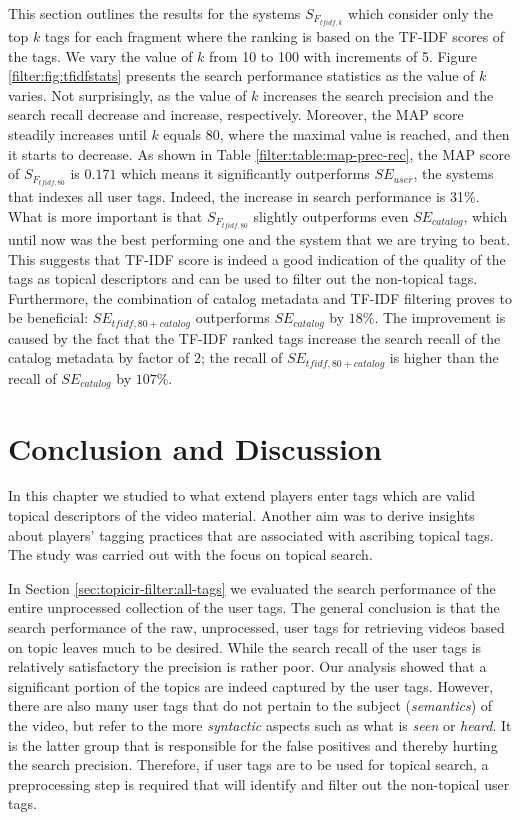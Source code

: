 This section outlines the results for the systems $S_{F_{tfidf,k}}$ which consider only the top $k$ tags for each fragment where the ranking is based on the TF-IDF scores of the tags. We vary the value of $k$ from 10 to 100 with increments of 5. Figure \ref{filter:fig:tfidfstats} presents the search performance statistics as the value of $k$ varies. Not surprisingly, as the value of $k$ increases the search precision and the search recall decrease and increase, respectively. Moreover, the MAP score steadily increases until $k$ equals 80, where the maximal value is reached, and then it starts to decrease. As shown in Table \ref{filter:table:map-prec-rec}, the MAP score of $S_{F_{tfidf,80}}$ is $0.171$ which means it significantly outperforms $SE_{user}$, the systems that indexes all user tags. Indeed, the increase in search performance is 31\%. What is more important is that $S_{F_{tfidf,80}}$ slightly outperforms even $SE_{catalog}$, which until now was the best performing one and the system that we are trying to beat. This suggests that TF-IDF score is indeed a good indication of the quality of the tags as topical descriptors and can be used to filter out the non-topical tags. Furthermore, the combination of catalog metadata and TF-IDF filtering proves to be beneficial: $SE_{tfidf,80 + catalog}$ outperforms  $SE_{catalog}$ by $18\%$. The improvement is caused by the fact that the TF-IDF ranked tags increase the search recall of the catalog metadata by factor of $2$; the recall of $SE_{tfidf,80 + catalog}$ is higher than the recall of $SE_{catalog}$ by $107\%$.

\section{Conclusion and Discussion}\label{sec:topicir-filter:con}
In this chapter we studied to what extend players enter tags which are valid topical descriptors of the video material. Another aim was to derive insights about players’ tagging practices that are associated with ascribing topical tags. The study was carried out with the focus on topical search.

In Section \ref{sec:topicir-filter:all-tags} we evaluated the search performance of the entire unprocessed collection of the user tags. The general conclusion is that the search performance of the raw, unprocessed, user tags for retrieving videos based on topic leaves much to be desired. While the search recall of the user tags is relatively satisfactory the precision is rather poor. Our analysis showed that a significant portion of the topics are indeed captured by the user tags. However, there are also many user tags that do not pertain to the subject (\textit{semantics}) of the video, but refer to the more \textit{syntactic} aspects such as what is \textit{seen} or \textit{heard}. It is the latter group that is responsible for the false positives and thereby hurting the search precision. Therefore, if user tags are to be used for topical search, a preprocessing step is required that will identify and filter out the non-topical user tags.

